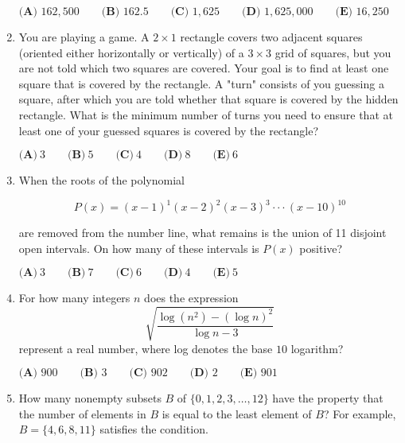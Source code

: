 \documentclass{article}
\begin{document}
\begin{enumerate}[label=\arabic*., itemsep=0.5em]
$\textbf{(A) }162,500\qquad\textbf{(B) }162.5\qquad\textbf{(C) }1,625\qquad\textbf{(D) }1,625,000\qquad\textbf{(E) }16,250$\par \vspace{0.5em}\item You are playing a game. A $2 \times 1$ rectangle covers two adjacent squares (oriented either horizontally or vertically) of a $3 \times 3$ grid of squares, but you are not told which two squares are covered. Your goal is to find at least one square that is covered by the rectangle. A "turn" consists of you guessing a square, after which you are told whether that square is covered by the hidden rectangle. What is the minimum number of turns you need to ensure that at least one of your guessed squares is covered by the rectangle?

$\textbf{(A)}~3\qquad\textbf{(B)}~5\qquad\textbf{(C)}~4\qquad\textbf{(D)}~8\qquad\textbf{(E)}~6$\par \vspace{0.5em}\item When the roots of the polynomial


\begin{equation*}
P(x)  = (x-1)^1 (x-2)^2 (x-3)^3 \cdot \cdot \cdot (x-10)^{10}
\end{equation*}


are removed from the number line, what remains is the union of 11 disjoint open intervals. On how many of these intervals is $P(x)$ positive?

$\textbf{(A)}~3\qquad\textbf{(B)}~7\qquad\textbf{(C)}~6\qquad\textbf{(D)}~4\qquad\textbf{(E)}~5$\par \vspace{0.5em}\item For how many integers $n$ does the expression
\begin{equation*}
\sqrt{\frac{\log (n^2) - (\log n)^2}{\log n - 3}}
\end{equation*}
represent a real number, where log denotes the base $10$ logarithm?

$\textbf{(A) }900 \qquad \textbf{(B) }3\qquad \textbf{(C) }902 \qquad \textbf{(D) } 2  \qquad \textbf{(E) }901$\par \vspace{0.5em}\item How many nonempty subsets $B$ of $\{0, 1, 2, 3, \dots, 12\}$ have the property that the number of elements in $B$ is equal to the least element of $B$? For example, $B = \{4, 6, 8, 11\}$ satisfies the condition.


\end{enumerate}
\end{document}
